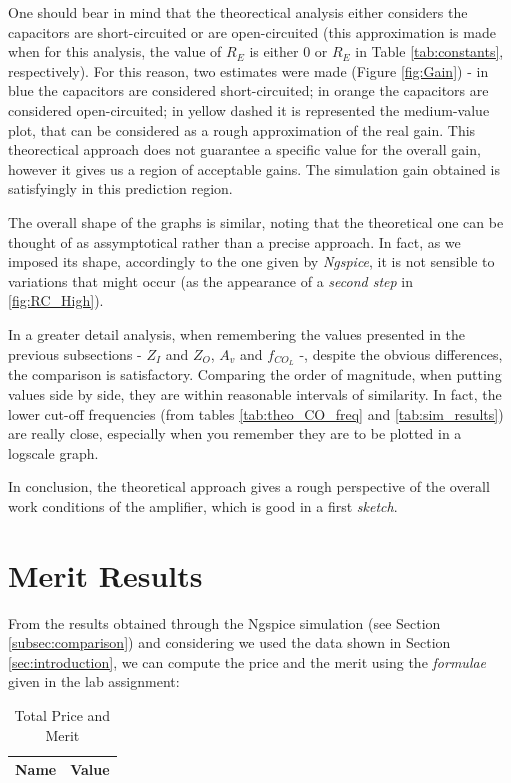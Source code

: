 One should bear in mind that the theorectical analysis either considers the capacitors are short-circuited or are open-circuited (this approximation is made when for this analysis, the value of $R_E$ is either $0$ or $R_E$ in Table \ref{tab:constants}, respectively). For this reason, two estimates were made (Figure \ref{fig:Gain}) - in blue the capacitors are considered short-circuited; in orange the capacitors are considered open-circuited; in yellow dashed it is represented the medium-value plot, that can be considered as a rough approximation of the real gain. This theorectical approach does not guarantee a specific value for the overall gain, however it gives us a region of acceptable gains. The simulation gain obtained is satisfyingly in this prediction region. 

The overall shape of the graphs is similar, noting that the theoretical one can be thought of as assymptotical rather than a precise approach. In fact, as we imposed its shape, accordingly to the one given by \textit{Ngspice}, it is not sensible to variations that might occur (as the appearance of a \textit{second step} in \ref{fig:RC_High}).

In a greater detail analysis, when remembering the values presented in the previous subsections - $Z_I$ and $Z_O$, $A_v$ and $f_{CO_L}$ -, despite the obvious differences, the comparison is satisfactory. Comparing the order of magnitude, when putting values side by side, they are within reasonable intervals of similarity. In fact, the lower cut-off frequencies (from tables \ref{tab:theo_CO_freq} and \ref{tab:sim_results}) are really close, especially when you remember they are to be plotted in a logscale graph.

In conclusion, the theoretical approach gives a rough perspective of the overall work conditions of the amplifier, which is good in a first \textit{sketch}.

\section{Merit Results}
\label{sec:merit}

From the results obtained through the Ngspice simulation (see Section \ref{subsec:comparison}) and considering we used the data shown in Section \ref{sec:introduction}, we can compute the price and the merit using the \textit{formulae} given in the lab assignment:

\begin{table}[h]
    \centering
    \begin{tabular}{|l|c|}
    \hline
    {\bf Name} & {\bf Value} \\ \hline
    
    \end{tabular}
    \caption{Total Price and Merit}
    \label{tab:price_merit}
\end{table}

